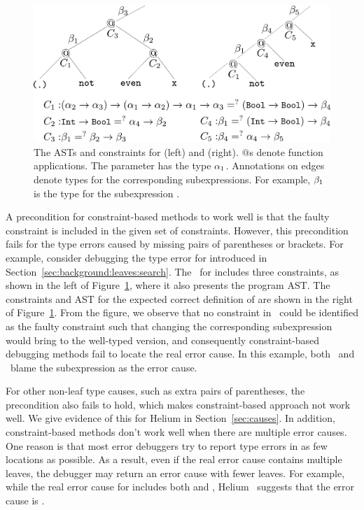 \documentclass[12pt]{report}	%
\begin{document}
\begin{figure}
\centering
\includegraphics[width=0.85\columnwidth]{images/nonstruc.pdf}
\caption{The ASTs and constraints for  (left)
and  (right).
\ensuremath{@}s denote function applications.
The parameter  has the type $\alpha_1$.
Annotations on edges denote types for the corresponding
subexpressions. For example, $\beta_1$ is the type for the
subexpression .}
\label{fig:nonstruc}
\end{figure}

A precondition for
constraint-based methods to work well is that the
faulty constraint is included in the given set of
constraints. However, this precondition fails
for the type errors caused by missing pairs of parentheses
or brackets.
For example,
consider debugging the type error for 
introduced in Section~\ref{sec:background:leaves:search}.
The \cs\ for  includes three constraints,
as shown in the left of Figure~\ref{fig:nonstruc}, where it
also presents the program AST. The constraints and AST for the
expected correct definition of  are shown in
the right of Figure~\ref{fig:nonstruc}. From the figure,
we observe that no constraint in \cs\ could be identified
as the faulty constraint such that changing the corresponding
subexpression would bring  to the
well-typed version, and consequently constraint-based debugging
methods fail to locate the real error cause. In this example,
both \toolH\ and \toolS\ blame the subexpression 
as the error cause.

%
For other non-leaf type causes, such as extra pairs
of parentheses, the precondition also fails to hold,
which makes constraint-based approach not work well.
We give evidence of this
for Helium in Section~\ref{sec:causes}.
%
In addition, constraint-based methods don't work well when there are
multiple error causes. One reason is that most
error debuggers try to report type errors in as few locations
as possible. As a result, even if the real error cause contains
multiple leaves, the debugger may return an error cause with
fewer leaves. For example, while the real error cause for
 includes both \prog{(<)} and ,
Helium~\cite{Heeren05:TQT} suggests that the error cause
is .
\end{document}
